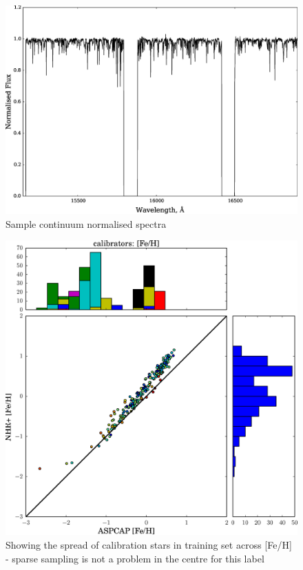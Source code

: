 \documentclass[12pt, preprint]{aastex}
\begin{document}
\begin{figure}[h!]
  \includegraphics[width=\hsize]{./plots/normed_300.eps}
\caption{Sample continuum normalised spectra}
\label{fig:DNA}
\end{figure}

\begin{figure}[h!]
  \includegraphics[width=\hsize]{./plots/cal_feh.eps}
\caption{Showing the spread of calibration stars in training set across [Fe/H] - sparse sampling is not a problem in the centre for this label}
\label{fig:cal_feh}
\end{figure}
\end{document}
